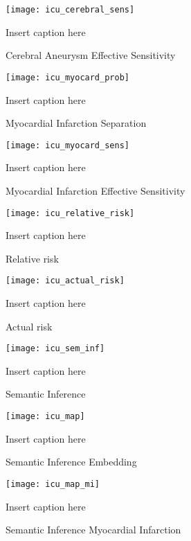 \begin{figure}
\texttt{[image: icu\_cerebral\_sens]}
\caption{Cerebral Aneurysm Effective Sensitivity}
\vspace{12px}
Insert caption here
\label{fig:icu_cerebral_sens}
\end{figure}

\begin{figure}
\texttt{[image: icu\_myocard\_prob]}
\caption{Myocardial Infarction Separation}
\vspace{12px}
Insert caption here
\label{fig:icu_myocard_prob}
\end{figure}

\begin{figure}
\texttt{[image: icu\_myocard\_sens]}
\caption{Myocardial Infarction Effective Sensitivity}
\vspace{12px}
Insert caption here
\label{fig:icu_myocard_sens}
\end{figure}

\begin{figure}
\texttt{[image: icu\_relative\_risk]}
\caption{Relative risk}
\vspace{12px}
Insert caption here
\label{fig:icu_relative_risk}
\end{figure}

\begin{figure}
\texttt{[image: icu\_actual\_risk]}
\caption{Actual risk}
\vspace{12px}
Insert caption here
\label{fig:icu_actual_risk}
\end{figure}

\begin{figure}
\texttt{[image: icu\_sem\_inf]}
\caption{Semantic Inference}
\vspace{12px}
Insert caption here
\label{fig:icu_sem_inf}
\end{figure}

\begin{figure}
\texttt{[image: icu\_map]}
\caption{Semantic Inference Embedding}
\vspace{12px}
Insert caption here
\label{fig:icu_map}
\end{figure}

\begin{figure}
\texttt{[image: icu\_map\_mi]}
\caption{Semantic Inference Myocardial Infarction}
\vspace{12px}
Insert caption here
\label{fig:icu_map_mi}
\end{figure}

